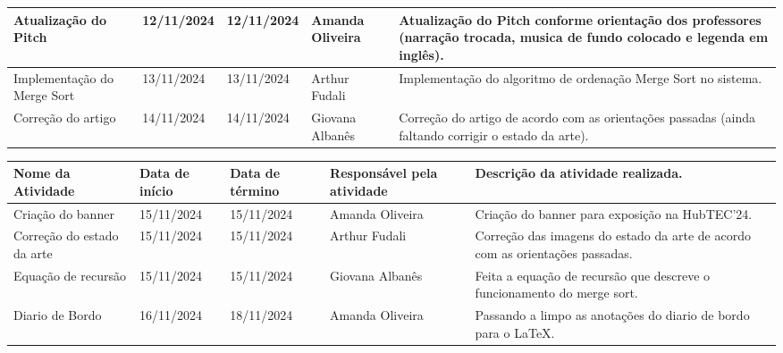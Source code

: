 \documentclass[
landscape,
  a4paper,%
  12pt,%
  english,%
  brazilian,%
]{article}
\begin{document}
\begin{table}[]
\begin{tabular}{|l|l|l|p{5cm}|p{8cm}|}
Atualização do Pitch                  & 12/11/2024      & 12/11/2024      & Amanda Oliveira             & Atualização do Pitch conforme orientação dos professores (narração trocada, musica de fundo colocado e legenda em inglês). \\ \hline
Implementação do Merge Sort           & 13/11/2024      & 13/11/2024      & Arthur Fudali               & Implementação do algoritmo de ordenação Merge Sort no sistema. \\ \hline
Correção do artigo                    & 14/11/2024      & 14/11/2024      & Giovana Albanês             & Correção do artigo de acordo com as orientações passadas (ainda faltando corrigir o estado da arte). \\ \hline
\end{tabular}
\end{table}

\break

\begin{table}[]
\begin{tabular}{|l|l|l|p{5cm}|p{8cm}|}
\hline
Nome da Atividade                     & Data de início  & Data de término & Responsável pela atividade  & Descrição da atividade realizada. \\ \hline
Criação do banner                     & 15/11/2024      & 15/11/2024      & Amanda Oliveira             & Criação do banner para exposição na HubTEC'24. \\ \hline
Correção do estado da arte            & 15/11/2024      & 15/11/2024      & Arthur Fudali               & Correção das imagens do estado da arte de acordo com as orientações passadas. \\ \hline
Equação de recursão                   & 15/11/2024      & 15/11/2024      & Giovana Albanês             & Feita a equação de recursão que descreve o funcionamento do merge sort. \\ \hline
Diario de Bordo                       & 16/11/2024      & 18/11/2024      & Amanda Oliveira             & Passando a limpo as anotações do diario de bordo para o LaTeX. \\ \hline
\end{tabular}
\end{table}
\end{document}
